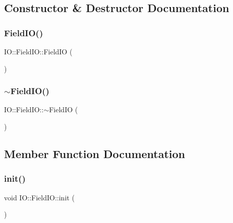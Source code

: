 \subsection{Constructor \& Destructor Documentation}
\mbox{\label{class_i_o_1_1_field_i_o_ae07d1c91bc341be3d295e77e420b1c9b}} 
\subsubsection{\texorpdfstring{FieldIO()}{FieldIO()}}
{\footnotesize\ttfamily I\+O\+::\+Field\+I\+O\+::\+Field\+IO (\begin{DoxyParamCaption}{ }\end{DoxyParamCaption})}

\mbox{\label{class_i_o_1_1_field_i_o_a48f5f4f12c445e98607b1e44db6d4ad1}} 
\subsubsection{\texorpdfstring{$\sim$FieldIO()}{~FieldIO()}}
{\footnotesize\ttfamily I\+O\+::\+Field\+I\+O\+::$\sim$\+Field\+IO (\begin{DoxyParamCaption}{ }\end{DoxyParamCaption})}



\subsection{Member Function Documentation}
\mbox{\label{class_i_o_1_1_field_i_o_ae01182be89137153bf043f9a34258601}} 
\subsubsection{\texorpdfstring{init()}{init()}}
{\footnotesize\ttfamily void I\+O\+::\+Field\+I\+O\+::init (\begin{DoxyParamCaption}{ }\end{DoxyParamCaption})\hspace{0.3cm}{\ttfamily [static]}}

